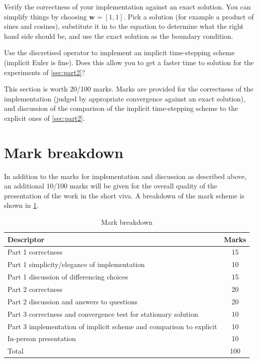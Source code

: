 \documentclass[11pt,a4paper]{article}
\renewcommand{\vec}[1]{\ensuremath{\mathbf{#1}}}
\begin{document}
Verify the correctness of your implementation against an exact
solution. You can simplify things by choosing $\vec{w} = [1, 1]$. Pick
a solution (for example a product of sines and cosines), substitute it
in to the equation to determine what the right hand side should be,
and use the exact solution as the boundary condition.

Use the discretised operator to implement an implicit time-stepping
scheme (implicit Euler is fine). Does this allow you to get a faster
time to solution for the experiments of \cref{sec:part2}?

This section is worth 20/100 marks. Marks are provided for the correctness
of the implementation (judged by appropriate convergence against an
exact solution), and discussion of the comparison of the implicit
time-stepping scheme to the explicit ones of \cref{sec:part2}.

\section*{Mark breakdown}
In addition to the marks for implementation and discussion as
described above, an additional 10/100 marks will be given for the
overall quality of the presentation of the work in the short viva. A breakdown of the
mark scheme is shown in \cref{tab:marks}.
\begin{table}[htbp]
  \centering
  \renewcommand\tabularxcolumn[1]{m{#1}}
  \begin{tabularx}{0.9\linewidth}{X|c}
    \toprule
    Descriptor & Marks\\
    \midrule
    Part 1 correctness & 15\\
    Part 1 simplicity/elegance of implementation & 10\\
    Part 1 discussion of differencing choices & 15\\
    \midrule
    Part 2 correctness & 20\\
    Part 2 discussion and answers to questions & 20\\
    \midrule
    Part 3 correctness and convergence test for stationary solution & 10\\
    Part 3 implementation of implicit scheme and comparison to
    explicit & 10\\
    \midrule
    In-person presentation & 10\\
    \midrule
    \midrule
    Total & 100\\
    \bottomrule
  \end{tabularx}
  \caption{Mark breakdown}
  \label{tab:marks}
\end{table}
\end{document}
